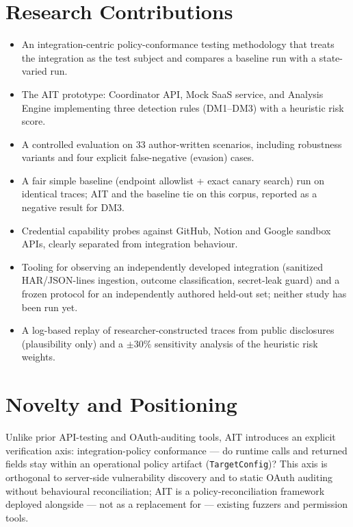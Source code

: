 \documentclass[12pt,a4paper]{report}
\begin{document}
\section{Research Contributions}

\begin{itemize}
    \item An integration-centric policy-conformance testing methodology that treats the integration as the test subject and compares a baseline run with a state-varied run.
    \item The AIT prototype: Coordinator API, Mock SaaS service, and Analysis Engine implementing three detection rules (DM1--DM3) with a heuristic risk score.
    \item A controlled evaluation on 33 author-written scenarios, including robustness variants and four explicit false-negative (evasion) cases.
    \item A fair simple baseline (endpoint allowlist + exact canary search) run on identical traces; AIT and the baseline tie on this corpus, reported as a negative result for DM3.
    \item Credential capability probes against GitHub, Notion and Google sandbox APIs, clearly separated from integration behaviour.
    \item Tooling for observing an independently developed integration (sanitized HAR/JSON-lines ingestion, outcome classification, secret-leak guard) and a frozen protocol for an independently authored held-out set; neither study has been run yet.
    \item A log-based replay of researcher-constructed traces from public disclosures (plausibility only) and a $\pm 30\%$ sensitivity analysis of the heuristic risk weights.
\end{itemize}

\section{Novelty and Positioning}

Unlike prior API-testing and OAuth-auditing tools, AIT introduces an explicit verification axis:
integration-policy conformance --- do runtime calls and returned fields stay within an operational
policy artifact (\texttt{TargetConfig})? This axis is orthogonal to server-side vulnerability
discovery and to static OAuth auditing without behavioural reconciliation; AIT is a
policy-reconciliation framework deployed alongside --- not as a replacement for --- existing
fuzzers and permission tools.
\end{document}

